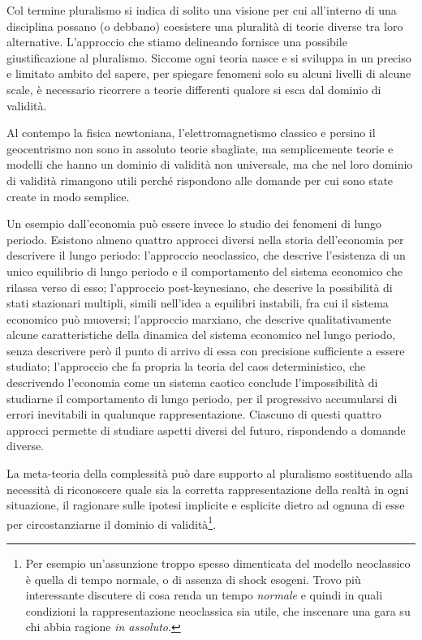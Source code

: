 \documentclass[a4paper, headings=standardclasses]{scrartcl}
\begin{document}
Col termine pluralismo si indica di solito una visione per cui all'interno di una disciplina possano (o debbano) coesistere una pluralità di teorie diverse tra loro alternative.
L'approccio che stiamo delineando fornisce una possibile giustificazione al pluralismo.
Siccome ogni teoria nasce e si sviluppa in un preciso e limitato ambito del sapere, per spiegare fenomeni solo su alcuni livelli di alcune scale, è necessario ricorrere a teorie differenti qualore si esca dal dominio di validità.

Al contempo la fisica newtoniana, l'elettromagnetismo classico e persino il geocentrismo non sono in assoluto teorie sbagliate, ma semplicemente teorie e modelli che hanno un dominio di validità non universale, ma che nel loro dominio di validità rimangono utili perché rispondono alle domande per cui sono state create in modo semplice.

Un esempio dall'economia può essere invece lo studio dei fenomeni di lungo periodo.
Esistono almeno quattro approcci diversi nella storia dell'economia per descrivere il lungo periodo: l'approccio neoclassico, che descrive l'esistenza di un unico equilibrio di lungo periodo e il comportamento del sistema economico che rilassa verso di esso; l'approccio post-keynesiano, che descrive la possibilità di stati stazionari multipli, simili nell'idea a equilibri instabili, fra cui il sistema economico può muoversi; l'approccio marxiano, che descrive qualitativamente alcune caratteristiche della dinamica del sistema economico nel lungo periodo, senza descrivere però il punto di arrivo di essa con precisione sufficiente a essere studiato; l'approccio che fa propria la teoria del caos deterministico, che descrivendo l'economia come un sistema caotico conclude l'impossibilità di studiarne il comportamento di lungo periodo, per il progressivo accumularsi di errori inevitabili in qualunque rappresentazione.
Ciascuno di questi quattro approcci permette di studiare aspetti diversi del futuro, rispondendo a domande diverse.

La meta-teoria della complessità può dare supporto al pluralismo sostituendo alla necessità di riconoscere quale sia la corretta rappresentazione della realtà in ogni situazione, il ragionare sulle ipotesi implicite e esplicite dietro ad ognuna di esse per circostanziarne il dominio di validità\footnote{Per esempio un'assunzione troppo spesso dimenticata del modello neoclassico è quella di tempo normale, o di assenza di shock esogeni. Trovo più interessante discutere di cosa renda un tempo \textit{normale} e quindi in quali condizioni la rappresentazione neoclassica sia utile, che inscenare una gara su chi abbia ragione \textit{in assoluto}.}.
\end{document}
